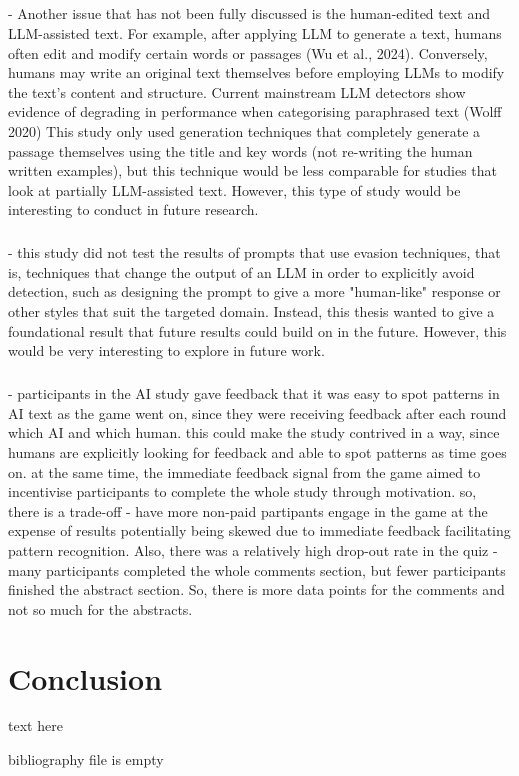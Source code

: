 \documentclass[thesis]{cluu}
\begin{document}
\paragraph{}
- Another issue that has not been fully discussed is the human-edited text and LLM-assisted text. For example, after applying LLM to generate a text, humans often edit and modify certain words or passages (Wu et al., 2024). Conversely, humans may write an original text themselves before employing LLMs to modify the text's content and structure. Current mainstream LLM detectors show evidence of degrading in performance when categorising paraphrased text (Wolff 2020) This study only used generation techniques that completely generate a passage themselves using the title and key words (not re-writing the human written examples), but this technique would be less comparable for studies that look at partially LLM-assisted text. However, this type of study would be interesting to conduct in future research. 
\paragraph{}
- this study did not test the results of prompts that use evasion techniques, that is, techniques that change the output of an LLM in order to explicitly avoid detection, such as designing the prompt to give a more "human-like" response or other styles that suit the targeted domain. Instead, this thesis wanted to give a foundational result that future results could build on in the future. However, this would be very interesting to explore in future work. 
\paragraph{}
- participants in the AI study gave feedback that it was easy to spot patterns in AI text as the game went on, since they were receiving feedback after each round which AI and which human. this could make the study contrived in a way, since humans are explicitly looking for feedback and able to spot patterns as time goes on. at the same time, the immediate feedback signal from the game aimed to incentivise participants to complete the whole study through motivation. so, there is a trade-off - have more non-paid partipants engage in the game at the expense of results potentially being skewed due to immediate feedback facilitating pattern recognition. Also, there was a relatively high drop-out rate in the quiz - many participants completed the whole comments section, but fewer participants finished the abstract section. So, there is more data points for the comments and not so much for the abstracts.


\chapter{Conclusion}
text here


\printbibliography
bibliography file is empty
\end{document}
